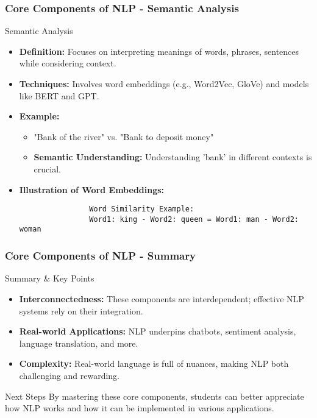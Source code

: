 \documentclass{beamer}
\begin{document}
\begin{frame}[fragile]
    \frametitle{Core Components of NLP - Semantic Analysis}
    \begin{block}{Semantic Analysis}
        \begin{itemize}
            \item \textbf{Definition:} Focuses on interpreting meanings of words, phrases, sentences while considering context.
            \item \textbf{Techniques:} Involves word embeddings (e.g., Word2Vec, GloVe) and models like BERT and GPT.
            \item \textbf{Example:}
            \begin{itemize}
                \item "Bank of the river" vs. "Bank to deposit money"
                \item \textbf{Semantic Understanding:} Understanding 'bank' in different contexts is crucial.
            \end{itemize}
            \item \textbf{Illustration of Word Embeddings:}
            \begin{lstlisting}
                Word Similarity Example:
                Word1: king - Word2: queen = Word1: man - Word2: woman
            \end{lstlisting}
        \end{itemize}
    \end{block}
\end{frame}

\begin{frame}[fragile]
    \frametitle{Core Components of NLP - Summary}
    \begin{block}{Summary & Key Points}
        \begin{itemize}
            \item \textbf{Interconnectedness:} These components are interdependent; effective NLP systems rely on their integration.
            \item \textbf{Real-world Applications:} NLP underpins chatbots, sentiment analysis, language translation, and more.
            \item \textbf{Complexity:} Real-world language is full of nuances, making NLP both challenging and rewarding.
        \end{itemize}
    \end{block}
    
    \begin{block}{Next Steps}
        By mastering these core components, students can better appreciate how NLP works and how it can be implemented in various applications.
    \end{block}
\end{frame}
\end{document}
